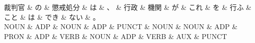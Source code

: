\documentclass[tikz,border=5pt]{standalone}
\begin{document}
\normalsize
\begin{dependency}[edge unit distance=12.0pt]
    \begin{deptext}[column sep=1em]
        裁判官 \& の \& 懲戒処分 \& は \& 、 \& 行政 \& 機関 \& が \& これ \& を \& 行ふ \& こと \& は \& でき \& ない \& 。\\
        NOUN \& ADP \& NOUN \& ADP \& PUNCT \& NOUN \& NOUN \& ADP \& PRON \& ADP \& VERB \& NOUN \& ADP \& VERB \& AUX \& PUNCT\\
    \end{deptext}
\end{dependency}
\end{document}
